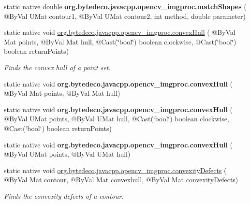 \begin{DoxyCompactItemize}
\mbox{\label{group__imgproc__shape_ga802fec5d9e13b63c134ade0e920fe7cb}} 
static native double {\bfseries org.\+bytedeco.\+javacpp.\+opencv\+\_\+imgproc.\+match\+Shapes} ( @By\+Val U\+Mat contour1, @By\+Val U\+Mat contour2, int method, double parameter)
\item 
static native void \hyperlink{group__imgproc__shape_gad55038a508ccdb2a51346a9321039983}{org.\+bytedeco.\+javacpp.\+opencv\+\_\+imgproc.\+convex\+Hull} ( @By\+Val Mat points, @By\+Val Mat hull, @Cast(\char`\"{}bool\char`\"{}) boolean clockwise, @Cast(\char`\"{}bool\char`\"{}) boolean return\+Points)
\begin{DoxyCompactList}\small\item\em Finds the convex hull of a point set. \end{DoxyCompactList}\item 
\mbox{\label{group__imgproc__shape_ga3ca5756bf3c700d741f008a5ee28f49a}} 
static native void {\bfseries org.\+bytedeco.\+javacpp.\+opencv\+\_\+imgproc.\+convex\+Hull} ( @By\+Val Mat points, @By\+Val Mat hull)
\item 
\mbox{\label{group__imgproc__shape_gac7226745217acd7ef4d6298ef30c0600}} 
static native void {\bfseries org.\+bytedeco.\+javacpp.\+opencv\+\_\+imgproc.\+convex\+Hull} ( @By\+Val U\+Mat points, @By\+Val U\+Mat hull, @Cast(\char`\"{}bool\char`\"{}) boolean clockwise, @Cast(\char`\"{}bool\char`\"{}) boolean return\+Points)
\item 
\mbox{\label{group__imgproc__shape_gad3606f6f4a3d715eeb5ecb41e95b6e3e}} 
static native void {\bfseries org.\+bytedeco.\+javacpp.\+opencv\+\_\+imgproc.\+convex\+Hull} ( @By\+Val U\+Mat points, @By\+Val U\+Mat hull)
\item 
static native void \hyperlink{group__imgproc__shape_ga5947a188964bc225faa41c8281dd16a4}{org.\+bytedeco.\+javacpp.\+opencv\+\_\+imgproc.\+convexity\+Defects} ( @By\+Val Mat contour, @By\+Val Mat convexhull, @By\+Val Mat convexity\+Defects)
\begin{DoxyCompactList}\small\item\em Finds the convexity defects of a contour. \end{DoxyCompactList}\item 
\mbox{\label{group__imgproc__shape_ga966bc37c9cf3731f716461c3ac5820c5}} 

\end{DoxyCompactItemize}
